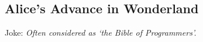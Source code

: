 
\subsection{Alice's Advance in Wonderland\cite{AliceWonderland}}

Joke: \textit{Often considered as `the Bible of Programmers'.}

\ifdetail{
} \fi


